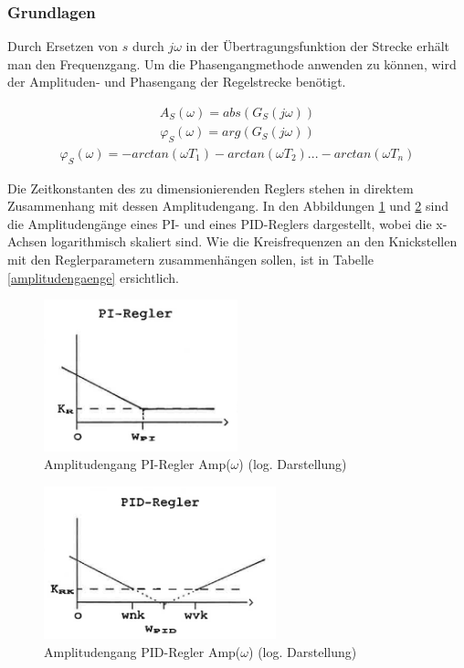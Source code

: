 \subsubsection{Grundlagen}
Durch Ersetzen von $s$ durch $j\omega$ in der Übertragungsfunktion der Strecke erhält man den Frequenzgang. Um die Phasengangmethode anwenden zu können, wird der Amplituden- und Phasengang der Regelstrecke benötigt.


\begin{align}
A_S(\omega)=abs(G_S(j\omega))
\end{align}
\begin{align}
\varphi_S(\omega)=arg(G_S(j\omega))
\end{align}
\begin{align}
\varphi_S(\omega)=-arctan(\omega T_1)-arctan(\omega T_2)...-arctan(\omega T_n)
\end{align}\newline

Die Zeitkonstanten des zu dimensionierenden Reglers stehen in direktem Zusammenhang mit dessen Amplitudengang. In den Abbildungen \ref{agangpi} und \ref{agangpid} sind die Amplitudengänge eines PI- und eines PID-Reglers dargestellt, wobei die x-Achsen logarithmisch skaliert sind. Wie die Kreisfrequenzen an den Knickstellen mit den Reglerparametern zusammenhängen sollen, ist in Tabelle \ref{amplitudengaenge} ersichtlich.\newline

\begin{figure}[h]
\centering
\includegraphics[width=0.5\textwidth]{agangpi.png}
\caption{Amplitudengang PI-Regler Amp($\omega$) (log. Darstellung)}
\label{agangpi}
\end{figure}

\begin{figure}[h]
\centering
\includegraphics[width=0.6\textwidth]{agangpid.png}
\caption{Amplitudengang PID-Regler Amp($\omega$) (log. Darstellung)}
\label{agangpid}
\end{figure}


